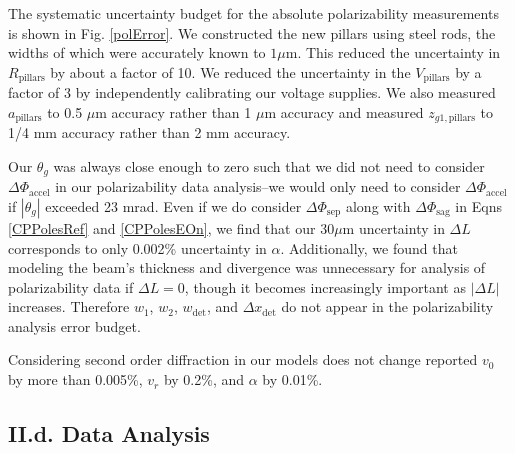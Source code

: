 \documentclass[twocolumn,prl,showpacs,superscriptaddress]{revtex4-1}   %
\newcommand{\figref}[1]{Fig. \ref{#1}}
\newcommand{\dphisep}{\Delta\Phi_{\mathrm{sep}}}
\newcommand{\dphisag}{\Delta\Phi_{\mathrm{sag}}}
\newcommand{\dphiaccel}{\Delta\Phi_{\mathrm{accel}}}
\begin{document}
The systematic uncertainty budget for the absolute polarizability measurements is shown in \figref{polError}. 
We constructed the new pillars using steel rods, the widths of which were accurately known to $1 \mu \text{m}$. This reduced the uncertainty in $R_{\mathrm{pillars}}$ by about a factor of 10.
We reduced the uncertainty in the $V_{\mathrm{pillars}}$ by a factor of 3 by independently calibrating our voltage supplies. We also measured $a_{\mathrm{pillars}}$ to 0.5 $\mu$m accuracy rather than 1 $\mu$m accuracy and measured $z_{g1,\mathrm{pillars}}$ to 1/4 mm accuracy rather than 2 mm accuracy. 

Our $\theta_g$ was always close enough to zero such that we did not need to consider $\dphiaccel$ in our polarizability data analysis--we would only need to consider $\dphiaccel$ if $|\theta_g|$ exceeded 23 mrad.
Even if we do consider $\dphisep$ along with $\dphisag$ in Eqns \ref{CPPolesRef} and \ref{CPPolesEOn}, we find that our 30$\mu$m uncertainty in $\Delta L$ corresponds to only 0.002\% uncertainty in $\alpha$.
Additionally, we found that modeling the beam's thickness and divergence was unnecessary for analysis of polarizability data if $\Delta L = 0$, though it becomes increasingly important as $|\Delta L|$ increases.
Therefore $w_1$, $w_2$, $w_{\mathrm{det}}$, and $\Delta x_{\mathrm{det}}$ do not appear in the polarizability analysis error budget.

Considering second order diffraction in our models does not change reported $v_0$ by more than 0.005\%, $v_r$ by 0.2\%, and $\alpha$ by 0.01\%.

\subsection{II.d. Data Analysis}
\end{document}
